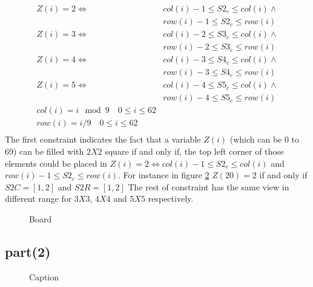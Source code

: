\documentclass[]{article}
\begin{document}
\begin{itemize}
\begin{align*}
Z(i)= 2 \Leftrightarrow &col(i)-1 \leq S2_c \leq col(i) \land \\
&row(i)-1 \leq S2_c \leq row(i)\\
Z(i)= 3 \Leftrightarrow &col(i)-2 \leq S3_c \leq col(i) \land \\
&row(i)-2 \leq S3_c \leq row(i)\\
Z(i)= 4 \Leftrightarrow &col(i)-3 \leq S4_c \leq col(i) \land \\
&row(i)-3 \leq S4_c \leq row(i)\\
Z(i)= 5 \Leftrightarrow &col(i)-4 \leq S5_c \leq col(i) \land \\
&row(i)-4 \leq S5_c \leq row(i)\\
col(i) = i \mod 9 \quad  0 \leq i \leq 62\\
row(i) = i / 9    \quad  0 \leq i \leq 62 \\
\end{align*}
The first constraint indicates the fact that a variable $Z(i)$ (which can be 0 to 69) can be filled with $2X2$ square if and only if, the top left corner of those elements could be placed in $Z(i)= 2 \Leftrightarrow col(i)-1 \leq S2_c \leq col(i)$ and $row(i)-1 \leq S2_c \leq row(i)$. For instance in figure \ref{fig:rectangle}  $Z(20) = 2$ if and only if $S2C = [1,2]$ and  $S2R = [1,2]$ The rest of constraint has the same view in different range for $3X3$, $4X4$ and $5X5$ respectively.
\begin{figure}[h]
\centering
{}
\caption{Board}
\label{fig:rectangle}
\end{figure}

\end{itemize}

\subsection*{part(2)}
\begin{figure}[h]
\centering
{}
\caption{Caption}
\label{fig:rectangle}
\end{figure}
\end{document}
